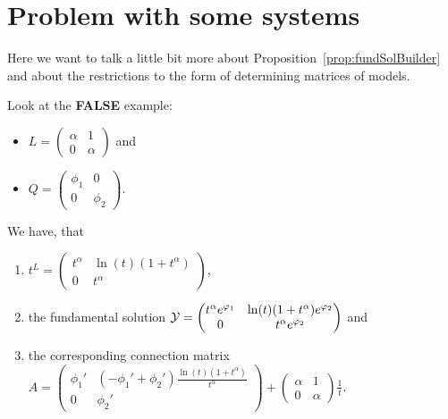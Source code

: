 \chapter{Problem with some systems}
\PROBLEM[remove?]

Here we want to talk a little bit more about
Proposition~\ref{prop:fundSolBuilder} and about the restrictions to the form of
determining matrices of models.

Look at the \textbf{FALSE} example:
\begin{itemize}
  \item $L=\begin{pmatrix} \alpha & 1 \\ 0 & \alpha \end{pmatrix}$ and
  \item $Q=\begin{pmatrix} \phi_1 & 0 \\ 0 & \phi_2 \end{pmatrix}$.
\end{itemize}
\begin{lem}
  We have, that 
  \begin{enumerate}
    \item $t^L=
      \begin{pmatrix}
        t^\alpha & \ln(t)(1+t^\alpha) \\ 0 & t^\alpha
      \end{pmatrix}$,
    \item the fundamental solution $\mathcal{Y}=
      \begin{pmatrix}
        t^\alpha e^{\varphi_1} & \ln(t)(1+t^\alpha)e^{\varphi_2}
        \\0 & t^\alpha e^{\varphi_2}
      \end{pmatrix}$ and
    \item the corresponding connection matrix $A=
      \begin{pmatrix}
        \phi_1' & (-\phi_1'+\phi_2')\frac{\ln(t)(1+t^\alpha)}{t^\alpha}
        \\0 & \phi_2'
      \end{pmatrix} 
      +
      \begin{pmatrix} \alpha & 1 \\ 0 & \alpha \end{pmatrix} \frac{1}{t}$.
  \end{enumerate}
\end{lem}
